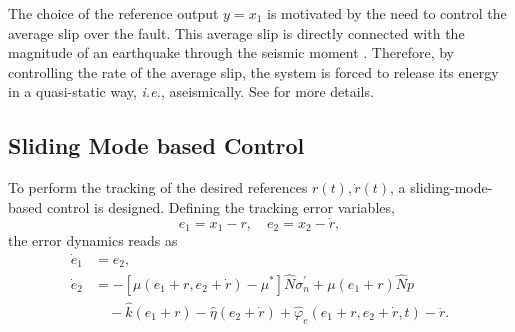 \documentclass[journal,twoside,web]{ieeecolor}
\begin{document}
The choice of the reference output $y=x_1$ is motivated by the need to control the average slip over the fault. This average slip is directly connected with the magnitude of an earthquake through the seismic moment \cite{b:Kanamori-Brodsky-2004}. Therefore, by controlling the rate of the average slip, the system is forced to release its energy in a quasi-static way, \textit{i.e.}, aseismically. See \cite{b:Stefanou2019,b:https://doi.org/10.1029/2021JB023410} for more details.


\subsection{Sliding Mode based Control}
\label{ssec:sliding-modes}

To perform the tracking of the desired references $r(t),\dot{r}(t)$, a sliding-mode-based control is designed. Defining the tracking error variables,
\begin{equation}
  e_1=x_1-r, \quad e_2=x_2-\dot{r},
\end{equation}
the error dynamics reads as
\begin{equation}
\begin{split}
  \dot{e}_1&=e_2,\\
  \dot{e}_2&=-[\mu(e_1+r,e_2+\dot{r})-\mu^*]\hat{N}\sigma_n^\prime + \mu(e_1+r)\hat{N} p \\
   & \quad -\hat{k}(e_1+r) - \hat{\eta}(e_2+\dot{r}) + \hat{\varphi}_e(e_1+r,e_2+\dot{r},t) -\ddot{r} .
  \label{eq:esystem}
\end{split}  
\end{equation}
\end{document}
